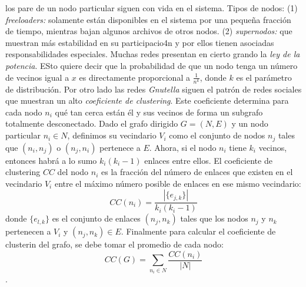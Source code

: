 los pare de un nodo particular siguen con vida en el sistema. Tipos de nodos: (1) \emph{freeloaders:} solamente están disponibles en el sistema por una pequeña fracción de tiempo, mientras bajan algunos archivos de otros nodos. (2) \emph{supernodos:} que muestran más estabilidad en su participacio4n y por ellos tienen asociadas responsabilidades especiales. Muchas redes presentan en cierto grando la \emph{ley de la potencia}. ESto quiere decir que la probabilidad de que un nodo tenga un número de vecinos igual a $x$ es directamente proporcional a $\displaystyle \frac{1}{n^k}$, donde $k$ es el parámetro de distribución. Por otro lado las redes \emph{Gnutella} siguen el patrón de redes sociales que muestran un alto \emph{coeficiente de clustering}. Este coeficiente determina para cada nodo $n_i$ qué tan cerca están él y sus vecinos de forma un subgrafo totalmente desconectado. Dado el grafo dirigido $G = (N, E)$ y un nodo particular $n_i \in N$, definimos su vecindario $V_i$ como el conjunto de nodos $n_j$ tales que $(n_i, n_j)$ o $(n_j, n_i)$ pertenece a $E$. Ahora, si el nodo $n_i$ tiene $k_i$ vecinos, entonces habrá a lo sumo $k_i(k_i -1)$ enlaces entre ellos. El coeficiente de clustering $CC$ del nodo $n_i$ es la fracción del número de enlaces que existen en el vecindario $V_i$ entre el máximo número posible de enlaces en ese mismo vecindario: $$\displaystyle CC(n_i) = \frac{|\{e_{j, k}\}|}{k_i(k_i - 1)}$$ donde $\{e_{l, k}\}$ es el conjunto de enlaces $(n_j, n_k)$ tales que los nodos $n_j$ y $n_k$ pertenecen a $V_i$ y $(n_j, n_k) \in E$. Finalmente para calcular el coeficiente de clusterin del grafo, se debe tomar el promedio de cada nodo: $$\displaystyle CC(G) = \sum_{n_{i} \in N} \frac{CC(n_i)}{|N|}$$.

